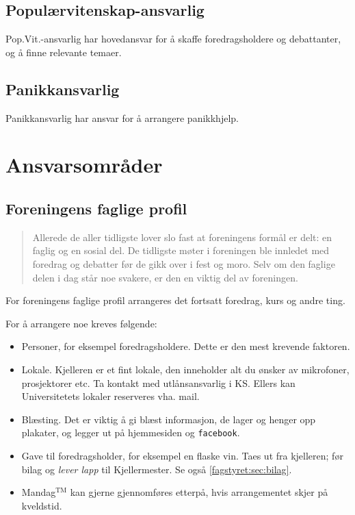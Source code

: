 \subsection{Populærvitenskap-ansvarlig}
Pop.Vit.-ansvarlig har hovedansvar for å skaffe foredragsholdere og debattanter,
og å finne relevante temaer.

\subsection{Panikkansvarlig}
Panikkansvarlig har ansvar for å arrangere panikkhjelp.

\section{Ansvarsområder}
\subsection{Foreningens faglige profil}
\begin{quote}
	Allerede de aller tidligste lover slo fast at foreningens formål er delt: en
	faglig og en sosial del. De tidligste møter i foreningen ble innledet
	med foredrag og debatter før de gikk over i fest og moro. Selv om den
	faglige delen i dag står noe svakere, er den en viktig del av
	foreningen.
\end{quote}

For foreningens faglige profil arrangeres det fortsatt foredrag, kurs og andre
ting.

For å arrangere noe kreves følgende:
\begin{itemize}
	\item Personer, for eksempel foredragsholdere. Dette er den mest
	krevende faktoren.
	\item Lokale. 
          Kjelleren er et fint lokale, den inneholder alt du ønsker av
          mikrofoner, prosjektorer etc. Ta kontakt med utlånsansvarlig i KS.
          Ellers kan Universitetets lokaler reserveres vha. mail.
	\item Blæsting. Det er viktig å gi blæst informasjon, de lager og henger
          opp plakater, og legger ut på hjemmesiden og \texttt{facebook}. 
	\item Gave til foredragsholder, for eksempel en flaske vin. 
          Taes ut fra kjelleren; før bilag og \emph{lever lapp} til
          Kjellermester. Se også \ref{fagstyret:sec:bilag}.
	\item Mandag$^\text{TM}$ kan gjerne gjennomføres etterpå, hvis
          arrangementet skjer på kveldstid.
\end{itemize}

